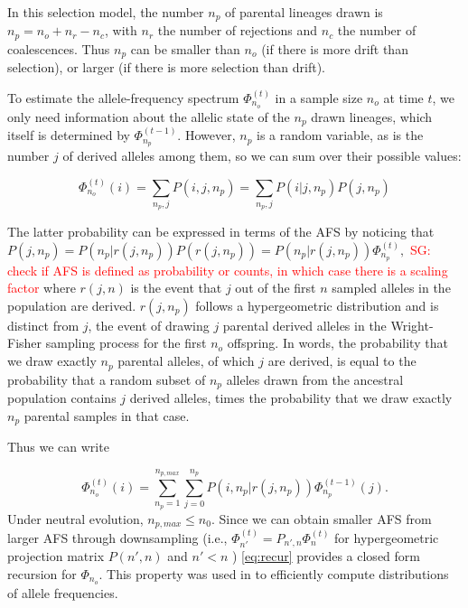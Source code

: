\documentclass[review]{elsarticle}
\newcommand{\afs}[2]{\Phi_{#1}^{(#2)}}
\newcommand{\sgcomment}[1]{\textcolor{red}{SG: #1}}
\begin{document}

In this selection model, the number $n_p$ of parental lineages drawn is $n_p = n_o+n_r-n_c$, with $n_r$ 
the number of rejections and $n_c$ the number of coalescences. 
Thus $n_p$ can be smaller than $n_o$ (if there is more drift than selection), or larger 
(if there is more selection than drift). 

To estimate the allele-frequency spectrum $\afs{n_o}{t}$  in a sample size $n_o$ at time $t$, 
we only need information about the allelic state of the $n_p$ drawn lineages, which itself 
is determined by $\afs{n_p}{t-1}.$ However, $n_p$ is a random variable, as is the number $j$ of derived alleles among them,
so we can sum over their possible values:

 $$\afs{n_o}{t}(i)=\sum_{n_p,j} P(i,j,n_p) =  \sum_{n_p,j} P(i | j,n_p) P(j,n_p) $$


The latter probability can be expressed in terms of the AFS by noticing that $ P(j,n_p) = P(n_p | r(j,n_p) ) P(r(j,n_p)) = P(n_p | r(j,n_p) )
\afs{n_p}{t},$ \sgcomment{check if AFS is defined as probability or counts, in which case there is a scaling factor} where $r(j,n)$ is the event that $j$ out of the first $n$ sampled alleles in the population are derived. $r(j,n_p)$ follows a hypergeometric distribution and is distinct from $j$, the event of drawing $j$ parental derived alleles in the Wright-Fisher sampling process for the first $n_o$ offspring.
In words, the probability that we draw exactly $n_p$ parental alleles, of which $j$ are derived, is equal to the probability that a random subset of $n_p$ alleles drawn from the ancestral population contains $j$ derived alleles, times the probability that we draw exactly $n_p$ parental samples in that case.
 

Thus we can write
 
 \begin{equation}
\label{eq:recur}
 \afs{n_o}{t}(i)= \sum_{n_p=1}^{n_{p,max}} \sum_{j=0}^{n_p} P(i, n_p | r(j,n_p)) \afs{n_p}{t-1}(j).
\end{equation}
Under neutral evolution, $n_{p,max}\leq n_0$. Since we can obtain smaller AFS from larger AFS through downsampling (i.e., $\afs{n'}{t}  = P_{n',n} \afs{n}{t}$ for hypergeometric projection matrix $P(n',n)$ and $n'<n$ )  \eqref{eq:recur} provides a closed form recursion for $\Phi_{n_o}.$ 
This property was used in \cite{JouganousEtAl2017} to efficiently compute distributions of allele frequencies.  
\end{document}
